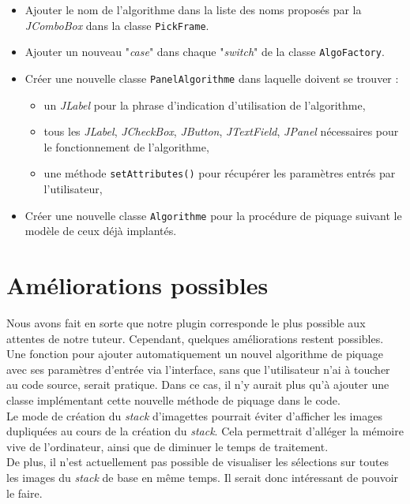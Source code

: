 \begin{itemize}
\item Ajouter le nom de l'algorithme dans la liste des noms proposés par la \emph{JComboBox} dans la classe \texttt{PickFrame}.
\item Ajouter un nouveau "\textit{case}" dans chaque "\textit{switch}" de la classe \texttt{AlgoFactory}.
\item Créer une nouvelle classe \texttt{PanelAlgorithme} dans laquelle doivent se trouver :
	\begin{itemize}
	\item un \emph{JLabel} pour la phrase d'indication d'utilisation de l'algorithme,
	\item tous les \emph{JLabel}, \emph{JCheckBox}, \emph{JButton}, \emph{JTextField}, \emph{JPanel} nécessaires pour le fonctionnement de l'algorithme,
	\item une méthode \texttt{setAttributes()} pour récupérer les paramètres entrés par l'utilisateur,
	\end{itemize}
\item Créer une nouvelle classe \texttt{Algorithme} pour la procédure de piquage suivant le modèle de ceux déjà implantés. 
\end{itemize}
\pagebreak
\section{Améliorations possibles}

Nous avons fait en sorte que notre plugin corresponde le plus possible aux attentes de notre tuteur. Cependant, quelques améliorations restent possibles. \\

Une fonction pour ajouter automatiquement un nouvel algorithme de piquage avec ses paramètres d'entrée via l'interface, sans que l'utilisateur n'ai à toucher au code source, serait pratique. Dans ce cas, il n'y aurait plus qu'à ajouter une classe implémentant cette nouvelle méthode de piquage dans le code. \\

Le mode de création du \textit{stack} d'imagettes pourrait éviter d'afficher les images dupliquées au cours de la création du \textit{stack}. Cela permettrait d'alléger la mémoire vive de l'ordinateur, ainsi que de diminuer le temps de traitement. \\
De plus, il n'est actuellement pas possible de visualiser les sélections sur toutes les images du \textit{stack} de base en même temps. Il serait donc intéressant de pouvoir le faire. \\

